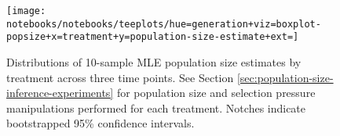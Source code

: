 \begin{figure}
  \centering
  \texttt{[image: notebooks/notebooks/teeplots/hue=generation+viz=boxplot-popsize+x=treatment+y=population-size-estimate+ext=]}
  \caption{
  Distributions of 10-sample MLE population size estimates by treatment across three time points.
  See Section \ref{sec:population-size-inference-experiments} for population size and selection pressure manipulations performed for each treatment.
  Notches indicate bootstrapped 95\% confidence intervals.}
  \label{fig:ne-estimate-distributions}
\end{figure}

